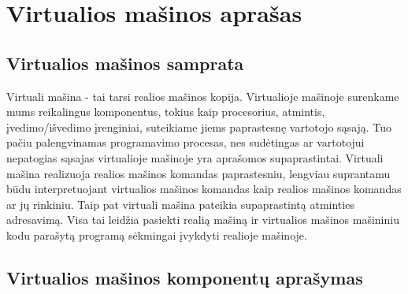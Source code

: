 \section{Virtualios mašinos aprašas}

\subsection{Virtualios mašinos samprata}

Virtuali mašina - tai tarsi realios mašinos kopija. Virtualioje mašinoje
surenkame mums reikalingus komponentus, tokius kaip procesorius,
atmintis, įvedimo/išvedimo įrenginiai, suteikiame jiems paprastesnę
vartotojo sąsają. Tuo pačiu palengvinamas programavimo procesas,
nes sudėtingas ar vartotojui nepatogias sąsajas virtualioje mašinoje yra 
aprašomos supaprastintai. Virtuali mašina realizuoja realios mašinos
komandas paprastesniu, lengviau suprantamu būdu interpretuojant virtualios
mašinos komandas kaip realios mašinos komandas ar jų rinkiniu. Taip pat 
virtuali mašina pateikia supaprastintą atminties adresavimą. Visa tai 
leidžia pasiekti realią mašiną ir virtualios mašinos mašininiu kodu 
parašytą programą sėkmingai įvykdyti realioje mašinoje. 

\subsection{Virtualios mašinos komponentų aprašymas}

